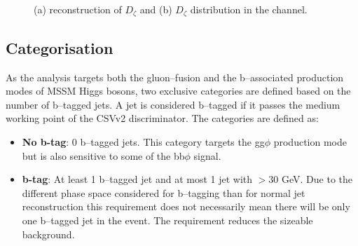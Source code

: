 \begin{figure}[h!]
\begin{center}
\end{center}
\caption{(a) reconstruction of $D_{\zeta}$ \cite{cdf-dzeta} and (b) $D_{\zeta}$ distribution in the 
\emu channel\cite{CMS-PAS-HIG-16-037}.}
\label{fig:mssm_dzeta}
\end{figure}


\subsection{Categorisation}
\label{sec:mssm_eventsel_categories}
As the analysis targets both the gluon--fusion
and the b--associated production modes of MSSM Higgs
bosons, two exclusive categories are defined based on the 
number of b--tagged jets. A jet is considered b--tagged
if it passes the medium working point of the \ac{CSV}v2 discriminator. 
The categories are defined as:
\begin{itemize}
\setlength{\itemsep}{-\baselineskip}
\item \textbf{No b-tag}: 0 b--tagged jets. This category targets the gg$\phi$ production mode but is also sensitive to some of the bb$\phi$ signal.
\item \textbf{b-tag}: At least 1 b--tagged jet and at most 1 
jet with \pT$>30$ GeV. Due to the different phase space considered for
b--tagging than for normal jet reconstruction this requirement does not necessarily
mean there will be only one b--tagged jet in the event. The requirement reduces the sizeable \ttbar
background.
\end{itemize}

